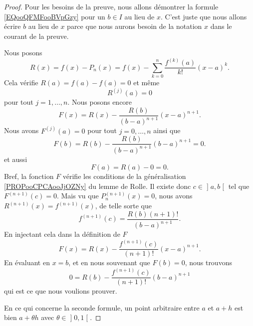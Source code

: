 \begin{proof}
	Pour les besoins de la preuve, nous allons démontrer la formule \eqref{EQooQFMFooBVpGzy} pour un \( b\in I\) au lieu de \( x\). C'est juste que nous allons écrire \( b\) au lieu de \( x\) parce que nous aurons besoin de la notation \( x\) dans le courant de la preuve.

	Nous posons
	\begin{equation}
		R(x)=f(x)-P_n(x)=f(x)-\sum_{k=0}^n\frac{ f^{(k)}(a) }{ k! }(x-a)^k.
	\end{equation}
	Cela vérifie \( R(a)=f(a)-f(a)=0\) et même
	\begin{equation}
		R^{(j)}(a)=0
	\end{equation}
	pour tout \( j=1,\ldots, n\). Nous posons encore
	\begin{equation}
		F(x)=R(x)-\frac{ R(b) }{ (b-a)^{n+1} }(x-a)^{n+1}.
	\end{equation}
	Nous avons \( F^{(j)}(a)=0\) pour tout \( j=0,\ldots, n\) ainsi que
	\begin{equation}
		F(b)=R(b)-\frac{ R(b) }{ (b-a)^{n+1} }(b-a)^{n+1}=0.
	\end{equation}
	et aussi
	\begin{equation}
		F(a)=R(a)-0=0.
	\end{equation}
	Bref, la fonction \( F\) vérifie les conditions de la généralisation \ref{PROPooCPCAooJjOZNy} du lemme de Rolle. Il existe donc \( c\in\mathopen] a , b \mathclose[\) tel que \( F^{(n+1)}(c)=0\). Mais vu que \( P_n^{(n+1)}(x)=0\), nous avons \( R^{(n+1)}(x)=f^{(n+1)}(x)\), de telle sorte que
	\begin{equation}
		f^{(n+1)}(c)=\frac{ R(b)(n+1)! }{ (b-a)^{n+1} }.
	\end{equation}
	En injectant cela dans la définition de \( F\)
	\begin{equation}
		F(x)=R(x)-\frac{ f^{(n+1)}(c) }{ (n+1)! }(x-a)^{n+1}.
	\end{equation}
	En évaluant en \( x=b\), et en nous souvenant que \( F(b)=0\), nous trouvons
	\begin{equation}
		0=R(b)-\frac{ f^{(n+1)}(c) }{ (n+1)! }(b-a)^{n+1}
	\end{equation}
	qui est ce que nous voulions prouver.

	En ce qui concerne la seconde formule, un point arbitraire entre \( a\) et \( a+h\) est bien \( a+\theta h\) avec \( \theta\in\mathopen] 0,1\mathclose[\).
\end{proof}

